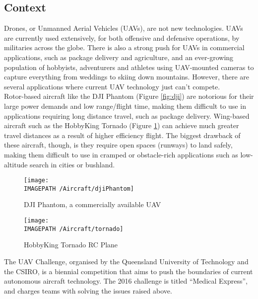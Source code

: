 \label{sec:intro}
\subsection{Context}
Drones, or Unmanned Aerial Vehicles (UAVs), are not new technologies. UAVs are currently used extensively, for both offensive\cite{ref:offence} and defensive\cite{ref:defence} operations, by militaries across the globe. There is also a strong push for UAVs in commercial applications, such as package delivery\cite{ref:package} and agriculture\cite{ref:agriculture}, and an ever-growing population of hobbyists\cite{ref:hobby}, adventurers\cite{ref:adventure} and athletes\cite{ref:sport} using UAV-mounted cameras to capture everything from weddings to skiing down mountains. However, there are several applications where current UAV technology just can't compete.\\

Rotor-based aircraft like the DJI Phantom (Figure \ref{fig:dji}) are notorious for their  large power demands and low range/flight time, making them difficult to use in applications requiring long distance travel, such as package delivery. Wing-based aircraft such as the HobbyKing Tornado\cite{ref:tornado} (Figure \ref{fig:tornado}) can achieve much greater travel distances as a result of higher efficiency flight. The biggest drawback of these aircraft, though, is they require open spaces (runways) to land safely, making them difficult to use in cramped or obstacle-rich applications such as low-altitude search in cities or bushland.

\begin{figure}[!ht]
	\centering
	\begin{minipage}{.5\textwidth}
		\centering
		\texttt{[image: \\IMAGEPATH /Aircraft/djiPhantom]}
		\caption{DJI Phantom, a commercially available UAV}
		\label{fig:dji}
	\end{minipage}%
	\begin{minipage}{.5\textwidth}
		\centering
		\texttt{[image: \\IMAGEPATH /Aircraft/tornado]}
		\caption{HobbyKing Tornado RC Plane}
		\label{fig:tornado}
	\end{minipage}
\end{figure}
 
The UAV Challenge\cite{ref:challenge}, organised by the Queensland University of Technology and the CSIRO, is a biennial competition that aims to push the boundaries of current autonomous aircraft technology. The 2016 challenge is titled ``Medical Express'', and charges teams with solving the issues raised above.\\

